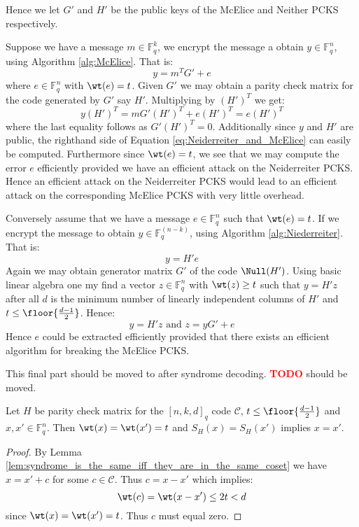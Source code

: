 Hence we let $G'$ and $H'$ be the public keys of the McElice and Neither PCKS respectively.

Suppose we have a message $m \in \mathbb{F}_q^k$, we encrypt the message a obtain $y \in \mathbb{F}_q^{n}$, using Algorithm \ref{alg:McElice}. That is:
\begin{equation*}
  y = m^T G' + e
\end{equation*}
where $e \in \mathbb{F}_q^n$ with $\wt(e) = t$. Given $G'$ we may obtain a parity check matrix for the code generated by $G'$ say $H'$. Multiplying by $(H')^T$ we get:
\begin{equation}\label{eq:Neiderreiter_and_McElice}
  y(H')^T = mG'(H')^T + e (H')^T = e (H')^T
\end{equation}
where the last equality follows as $G'(H')^T = 0$. Additionally since $y$ and $H'$ are public, the righthand side of Equation \eqref{eq:Neiderreiter_and_McElice} can easily be computed. Furthermore since $\wt(e) = t$, we see that we may compute the error $e$ efficiently provided we have an efficient attack on the Neiderreiter PCKS. Hence an efficient attack on the Neiderreiter PCKS would lead to an efficient attack on the corresponding McElice PCKS with very little overhead.

Conversely assume that we have a message $e \in \mathbb{F}_q^{n}$ such that $\wt(e) = t$. If we encrypt the message to obtain $y \in \mathbb{F}_q^{(n - k)}$, using Algorithm \ref{alg:Niederreiter}. That is:
\begin{equation*}
  y = H'e
\end{equation*}
Again we may obtain generator matrix $G'$ of the code $\Null(H')$. Using basic linear algebra one my find a vector $z \in \mathbb{F}_q^n$ with $\wt(z) \geq t$ such that $y = H'z$ after all $d$ is the minimum number of linearly independent columns of $H'$ and $t \leq \floor{\frac{d - 1}{2}}$. Hence:
\begin{equation*}
  y = H'z \text{ and } z = yG' + e
\end{equation*}
Hence $e$ could be extracted efficiently provided that there exists an efficient algorithm for breaking the McElice PCKS.

This final part should be moved to after syndrome decoding.
\textcolor{red}{\textbf{TODO}} should be moved.

\begin{lemma}\label{lem:equal_syndrome_and_equal_weight}
  Let $H$ be parity check matrix for the $[n, k, d]_q$ code $\mathcal{C}$, $t \leq \floor{\frac{d - 1}{2}}$ and $x, x' \in \mathbb{F}_q^n$. Then $\wt(x) = \wt(x') = t$ and $S_H(x) = S_H(x')$ implies $x = x'$.
\end{lemma}
\begin{proof}
  By Lemma \ref{lem:syndrome_is_the_same_iff_they_are_in_the_same_coset} we have $x = x' + c$ for some $c \in \mathcal{C}$. Thus $c = x - x'$ which implies:
  \begin{equation*}
    \wt(c) = \wt(x - x') \leq 2t < d
  \end{equation*}
  since $\wt(x) = \wt(x') = t$. Thus $c$ must equal zero.
\end{proof}

